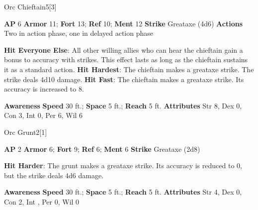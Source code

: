 \begin{monsection}{Orc Chieftain}{5}[3]
\vspace{-1em}\vspace{-1em}
\begin{spellcontent}
\begin{spelltargetinginfo}
{\textbf{AP} 6}
\pari \textbf{Armor} 11;
\textbf{Fort} 13;
\textbf{Ref} 10;
\textbf{Ment} 12
\pari \textbf{Strike} Greataxe  (4d6)
\pari \textbf{Actions} Two in action phase, one in delayed action phase
\end{spelltargetinginfo}
\begin{spelleffects}
\pari
\textbf{Hit Everyone Else}:
All other willing allies who can hear the chieftain gain a  bonus to accuracy with strikes.
This effect lasts as long as the chieftain sustains it as a standard action.
\vspace{0.5em}
\pari
\textbf{Hit Hardest}:
The chieftain makes a greataxe strike.
The strike deals 4d10 damage.
\vspace{0.5em}
\pari
\textbf{Hit Fast}:
The chieftain makes a greataxe strike.
Its accuracy is increased to 8.
\end{spelleffects}
\end{spellcontent}
\begin{spellsubcontent}
\begin{spellfooter}
\pari \textbf{Awareness} 
\pari \textbf{Speed} 30 ft.;
\textbf{Space} 5 ft.;
\textbf{Reach} 5 ft.
\pari \textbf{Attributes}
Str 8,
Dex 0,
Con 3,
Int 0,
Per 6,
Wil 6
\end{spellfooter}
\end{spellsubcontent}
\end{monsection}
\begin{monsection}{Orc Grunt}{2}[1]
\vspace{-1em}\vspace{-1em}
\begin{spellcontent}
\begin{spelltargetinginfo}
{\textbf{AP} 2}
\pari \textbf{Armor} 6;
\textbf{Fort} 9;
\textbf{Ref} 6;
\textbf{Ment} 6
\pari \textbf{Strike} Greataxe  (2d8)
\end{spelltargetinginfo}
\begin{spelleffects}
\pari
\textbf{Hit Harder}:
The grunt makes a greataxe strike.
Its accuracy is reduced to 0, but the strike deals 4d6 damage.
\end{spelleffects}
\end{spellcontent}
\begin{spellsubcontent}
\begin{spellfooter}
\pari \textbf{Awareness} 
\pari \textbf{Speed} 30 ft.;
\textbf{Space} 5 ft.;
\textbf{Reach} 5 ft.
\pari \textbf{Attributes}
Str 4,
Dex 0,
Con 2,
Int ,
Per 0,
Wil 0
\end{spellfooter}
\end{spellsubcontent}
\end{monsection}

